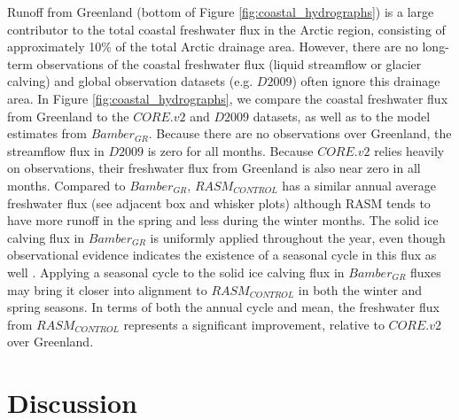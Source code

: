 \documentclass[jgrga, draft]{agutex}
\begin{document}
\begin{article}
Runoff from Greenland (bottom of Figure \ref{fig:coastal_hydrographs}) is a large contributor to the total coastal freshwater flux in the Arctic region, consisting of approximately 10\% of the total Arctic drainage area.
However, there are no long-term observations of the coastal freshwater flux (liquid streamflow or glacier calving) and global observation datasets (e.g. $D2009$) often ignore this drainage area.
In Figure \ref{fig:coastal_hydrographs}, we compare the coastal freshwater flux from Greenland to the $CORE.v2$ and $D2009$ datasets, as well as to the model estimates from $Bamber_{GR}$.
Because there are no observations over Greenland, the streamflow flux in $D2009$ is zero for all months.
Because $CORE.v2$ relies heavily on observations, their freshwater flux from Greenland is also near zero in all months.
Compared to $Bamber_{GR}$, $RASM_{CONTROL}$ has a similar annual average freshwater flux (see adjacent box and whisker plots) although RASM tends to have more runoff in the spring and less during the winter months.
The solid ice calving flux in $Bamber_{GR}$ is uniformly applied throughout the year, even though observational evidence indicates the existence of a seasonal cycle in this flux as well \citep[e.g.][]{Joughin_2008}.
Applying a seasonal cycle to the solid ice calving flux in $Bamber_{GR}$ fluxes may bring it closer into alignment to $RASM_{CONTROL}$ in both the winter and spring seasons.
In terms of both the annual cycle and mean, the freshwater flux from $RASM_{CONTROL}$ represents a significant improvement, relative to $CORE.v2$ over Greenland.

\section{Discussion}
\label{sec:discussion}


\end{article}
\end{document}
